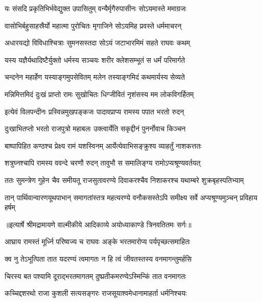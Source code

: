 \twolineshloka
{यः संसदि प्रकृतिभिर्भवेद्युक्त उपासितुम्}
{वन्यैर्मृगैरुपासीनः सोऽयमास्ते ममाग्रजः} %

\twolineshloka
{वासोभिर्बहुसाहस्रैर्यो महात्मा पुरोचितः}
{मृगाजिने सोऽयमिह प्रवस्ते धर्ममाचरन्} %

\twolineshloka
{अधारयद्यो विविधाश्चित्राः सुमनसस्तदा}
{सोऽयं जटाभारमिमं सहते राघवः कथम्} %

\twolineshloka
{यस्य यज्ञैर्यथादिष्टैर्युक्तो धर्मस्य सञ्चयः}
{शरीर क्लेशसम्भूतं स धर्मं परिमार्गते} %

\twolineshloka
{चन्दनेन महार्हेण यस्याङ्गमुपसेवितम्}
{मलेन तस्याङ्गमिदं कथमार्यस्य सेव्यते} %

\twolineshloka
{मन्निमित्तमिदं दुःखं प्राप्तो रामः सुखोचितः}
{धिग्जीवितं नृशंसस्य मम लोकविगर्हितम्} %

\twolineshloka
{इत्येवं विलपन्दीनः प्रस्विन्नमुखपङ्कजः}
{पादावप्राप्य रामस्य पपात भरतो रुदन्} %

\twolineshloka
{दुःखाभितप्तो भरतो राजपुत्रो महाबलः}
{उक्त्वार्येति सकृद्दीनं पुनर्नोवाच किञ्चन} %

\twolineshloka
{बाष्पापिहित कण्ठश्च प्रेक्ष्य रामं यशस्विनम्}
{आर्येत्येवाभिसङ्क्रुश्य व्याहर्तुं नाशकत्ततः} %

\twolineshloka
{शत्रुघ्नश्चापि रामस्य ववन्दे चरणौ रुदन्}
{तावुभौ स समालिङ्ग्य रामोऽप्यश्रूण्यवर्तयत्} %

\fourlineindentedshloka
{ततः सुमन्त्रेण गुहेन चैव}
{समीयतू राजसुतावरण्ये}
{दिवाकरश्चैव निशाकरश्च}
{यथाम्बरे शुक्रबृहस्पतिभ्याम्} %

\fourlineindentedshloka
{तान् पार्थिवान्वारणयूथपाभान्}
{समागतांस्तत्र महत्यरण्ये}
{वनौकसस्तेऽपि समीक्ष्य सर्वे}
{अप्यश्रूण्यमुञ्चन् प्रविहाय हर्षम्} %


{॥इत्यार्षे श्रीमद्रामायणे वाल्मीकीये आदिकाव्ये अयोध्याकाण्डे त्रिनवतितमः सर्गः॥}


\twolineshloka
{आघ्राय रामस्तं मूर्ध्नि परिष्वज्य च राघवः}
{अङ्के भरतमारोप्य पर्यपृच्छत्समाहितः} %

\twolineshloka
{क्व नु तेऽभूत्पिता तात यदरण्यं त्वमागतः}
{न हि त्वं जीवतस्तस्य वनमागन्तुमर्हसि} %

\twolineshloka
{चिरस्य बत पश्यामि दूराद्भरतमागतम्}
{दुष्प्रतीकमरण्येऽस्मिन्किं तात वनमागतः} %

\twolineshloka
{कच्चिद्दशरथो राजा कुशली सत्यसङ्गरः}
{राजसूयाश्वमेधानामाहर्ता धर्मनिश्चयः} %

